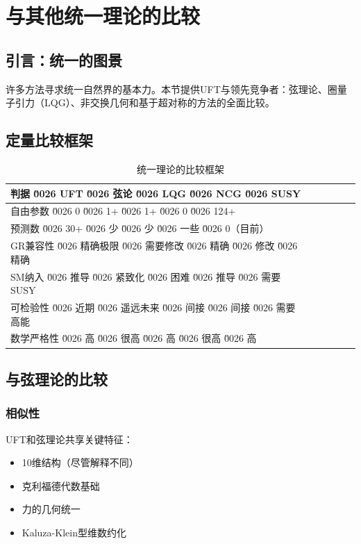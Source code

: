 \section{与其他统一理论的比较}
\label{sec:theory_comparison}

\subsection{引言：统一的图景}

许多方法寻求统一自然界的基本力。本节提供UFT与领先竞争者：弦理论、圈量子引力（LQG）、非交换几何和基于超对称的方法的全面比较。

\subsection{定量比较框架}

\begin{table}[htbp]
\centering
\caption{统一理论的比较框架}
\begin{tabular}{@{}lccccc@{}}
\toprule
\textbf{判据} \u0026 \textbf{UFT} \u0026 \textbf{弦论} \u0026 \textbf{LQG} \u0026 \textbf{NCG} \u0026 \textbf{SUSY} \\
\midrule
自由参数 \u0026 0 \u0026 1+ \u0026 1+ \u0026 0 \u0026 124+ \\
预测数 \u0026 30+ \u0026 少 \u0026 少 \u0026 一些 \u0026 0（目前） \\
GR兼容性 \u0026 精确极限 \u0026 需要修改 \u0026 精确 \u0026 修改 \u0026 精确 \\
SM纳入 \u0026 推导 \u0026 紧致化 \u0026 困难 \u0026 推导 \u0026 需要SUSY \\
可检验性 \u0026 近期 \u0026 遥远未来 \u0026 间接 \u0026 间接 \u0026 需要高能 \\
数学严格性 \u0026 高 \u0026 很高 \u0026 高 \u0026 很高 \u0026 高 \\
\bottomrule
\end{tabular}
\label{tab:theory_comparison}
\end{table}

\subsection{与弦理论的比较}

\subsubsection{相似性}

UFT和弦理论共享关键特征：
\begin{itemize}
    \item 10维结构（尽管解释不同）
    \item 克利福德代数基础
    \item 力的几何统一
    \item Kaluza-Klein型维数约化
\end{itemize}

